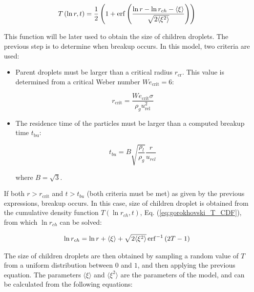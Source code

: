 \begin{equation}
\label{eq:gorokhovski_T_CDF}
T \left( \ln r, t \right) = \frac{1}{2} \left( 1 + \operatorname{erf} \left( \frac{\ln r - \ln r_{ch} - \langle \xi \rangle }{\sqrt{2 \langle \xi^2 \rangle}}\right)  \right)
\end{equation}

This function will be later used to obtain the size of children droplets. The previous step is to determine when breakup occurs. In this model, two criteria are used:

\begin{itemize}

	\item Parent droplets must be larger than a critical radius $r_\mathrm{cr}$. This value is determined from a critical Weber number $We_\mathrm{crit} = 6$:
	
	\begin{equation}
	r_\mathrm{crit} = \frac{We_\mathrm{crit} \sigma}{\rho_g u_\mathrm{rel}^2}
	\end{equation}
	
	\item The residence time of the particles must be larger than a computed breakup time $t_\mathrm{bu}$:
	
	\begin{equation}
	t_{bu} = B \sqrt{\frac{\rho_l}{\rho_g}} \frac{r}{u_{rel}}
	\end{equation}
	
	where $B = \sqrt{3}$.

\end{itemize}

If both $r > r_\mathrm{crit}$ and $t > t_{bu}$ (both criteria must be met) as given by the previous expressions, breakup occurs. In this case, size of children droplet is obtained from the cumulative density function $T \left( \ln r_{ch}, t \right)$, Eq. (\ref{eq:gorokhovski_T_CDF}), from which $\ln r_{ch}$ can be solved:
 
 
\begin{equation}
\ln r_{ch} = \ln r + \langle \xi \rangle  + \sqrt{2 \langle \xi^2 \rangle} \operatorname{erf}^{-1} \left(  2 T - 1 \right)
\end{equation}

The size of children droplets are then obtained by sampling a random value of $T$ from a uniform distribution between $0$ and $1$, and then applying the previous equation. The parameters $\langle \xi \rangle$ and $\langle \xi^2 \rangle$ are the parameters of the model, and can be calculated from the following equations:

